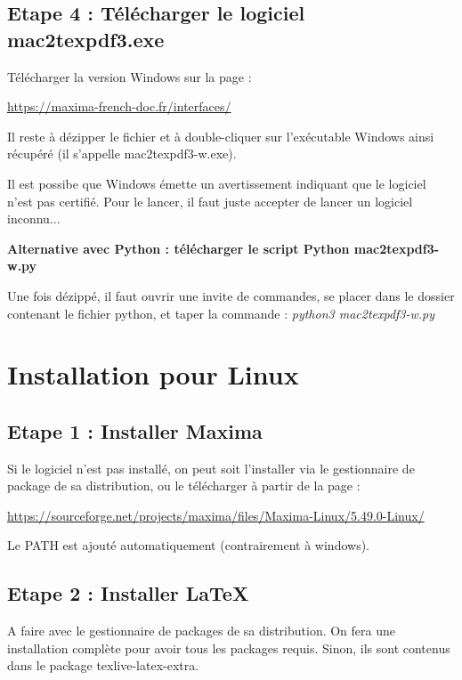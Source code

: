 \documentclass[a4paper, 11pt]{article}
\begin{document}
\subsection*{Etape 4 : Télécharger le logiciel mac2texpdf3.exe}
Télécharger la version Windows sur la page :

\begin{center}
\href{https://maxima-french-doc.fr/interfaces/}{https://maxima-french-doc.fr/interfaces/}
\end{center}
Il reste à dézipper le fichier et à double-cliquer sur l'exécutable Windows ainsi récupéré (il s'appelle mac2texpdf3-w.exe).

Il est possibe que Windows émette un avertissement indiquant que le logiciel n'est pas certifié. Pour le lancer, il faut juste accepter de lancer un logiciel inconnu...

\textbf{Alternative avec Python : télécharger le script Python mac2texpdf3-w.py}

Une fois dézippé, il faut ouvrir une invite de commandes, se placer dans le dossier contenant le fichier python, et taper la commande :
\textit{python3 mac2texpdf3-w.py}

\section*{Installation pour Linux}

\subsection*{Etape 1 : Installer Maxima}
Si le logiciel  n'est pas installé, on peut soit l'installer via le gestionnaire de package de sa distribution, ou le télécharger à partir de la page :

\begin{center}
\href{https://sourceforge.net/projects/maxima/files/Maxima-Linux/5.49.0-Linux/}{https://sourceforge.net/projects/maxima/files/Maxima-Linux/5.49.0-Linux/}
\end{center}
Le PATH est ajouté automatiquement (contrairement à windows).

\subsection*{Etape 2 : Installer \LaTeX{}}
A faire avec le gestionnaire de packages de sa distribution. On fera une installation complète pour avoir tous les packages requis. Sinon, ils sont contenus dans le package texlive-latex-extra.
\end{document}
